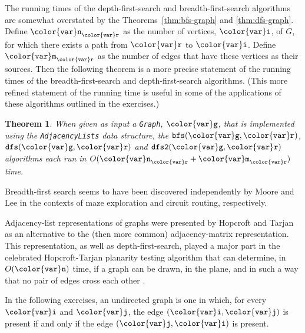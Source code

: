\documentclass[10pt]{book}
\theoremstyle{plain}
\newtheorem{thm}{Theorem}[chapter]
\newcommand{\thmlabel}[1]{\label{thm:#1}}
\theoremstyle{definition}
\begin{document}
The running times of the depth-first-search and breadth-first-search
algorithms are somewhat overstated by the Theorems~\ref{thm:bfs-graph} and
\ref{thm:dfs-graph}.  Define $\ensuremath{\mathtt{{\color{var}n}}}_{\ensuremath{\mathtt{{\color{var}r}}}}$ as the number of vertices, \ensuremath{\mathtt{{\color{var}i}}},
of $G$, for which there exists a path from \ensuremath{\mathtt{{\color{var}r}}} to \ensuremath{\mathtt{{\color{var}i}}}.  Define $\ensuremath{\mathtt{{\color{var}m}}}_\ensuremath{\mathtt{{\color{var}r}}}$
as the number of edges that have these vertices as their sources.
Then the following theorem is a more precise statement of the running
times of the breadth-first-search and depth-first-search algorithms.
(This more refined statement of the running time is useful in some of
the applications of these algorithms outlined in the exercises.)
\begin{thm}\thmlabel{graph-traversal}
  When given as input a \texttt{Graph}, \ensuremath{\mathtt{{\color{var}g}}}, that is implemented using the
  \texttt{AdjacencyLists} data structure, the \ensuremath{\mathtt{bfs({\color{var}g},{\color{var}r})}}, \ensuremath{\mathtt{dfs({\color{var}g},{\color{var}r})}} and \ensuremath{\mathtt{dfs2({\color{var}g},{\color{var}r})}}
  algorithms each run in $O(\ensuremath{\mathtt{{\color{var}n}}}_{\ensuremath{\mathtt{{\color{var}r}}}}+\ensuremath{\mathtt{{\color{var}m}}}_{\ensuremath{\mathtt{{\color{var}r}}}})$ time.
\end{thm}

Breadth-first search seems to have been discovered independently by
Moore \cite{m59} and Lee \cite{l61} in the contexts of maze exploration
and circuit routing, respectively.

Adjacency-list representations of graphs were presented by
Hopcroft and Tarjan \cite{ht73} as an alternative to the (then more
common) adjacency-matrix representation.  This representation, as well as
depth-first-search, played a major part in the celebrated Hopcroft-Tarjan
planarity testing algorithm 
%
that can determine, in $O(\ensuremath{\mathtt{{\color{var}n}}})$ time, if
a graph can be drawn, in the plane, and in such a way that no pair of
edges cross each other \cite{ht74}.

In the following exercises, an undirected graph is one in which, for
every \ensuremath{\mathtt{{\color{var}i}}} and \ensuremath{\mathtt{{\color{var}j}}}, the edge $(\ensuremath{\mathtt{{\color{var}i}}},\ensuremath{\mathtt{{\color{var}j}}})$ is present if and only if the
edge $(\ensuremath{\mathtt{{\color{var}j}}},\ensuremath{\mathtt{{\color{var}i}}})$ is present.
%
%
\end{document}
